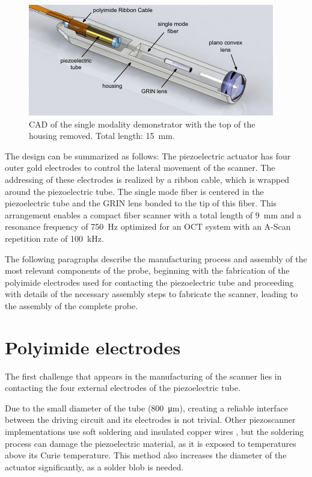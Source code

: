 \documentclass[10pt]{iopart}
\begin{document}
\begin{figure}[h!]\centering 
\includegraphics[width=\columnwidth]{figures/overview.pdf}
      \caption{CAD of the single modality demonstrator with the top of the housing removed. Total length: \SI{15}{\milli\meter}.}
      \label{fig:overview}
\end{figure}

The design can be summarized as follows: The piezoelectric actuator has four outer gold electrodes to control the lateral movement of the scanner. The addressing of these electrodes is realized by a ribbon cable, which is wrapped around the piezoelectric tube. The single mode fiber is centered in the piezoelectric tube and the GRIN lens bonded to the tip of this fiber. This arrangement enables a compact fiber scanner with a total length of \SI{9}{\milli\meter} and a resonance frequency of \SI{750}{\hertz} optimized for an OCT system with an A-Scan repetition rate of \SI{100}{\kilo\hertz}.

The following paragraphs describe the manufacturing process and assembly of the most relevant components of the probe, beginning with the fabrication of the polyimide electrodes used for contacting the piezoelectric tube and proceeding with details of the necessary assembly steps to fabricate the scanner, leading to the assembly of the complete probe.

\section{Polyimide electrodes}
The first challenge that appears in the manufacturing of the scanner lies in contacting the four external electrodes of the piezoelectric tube. 

Due to the small diameter of the tube (\SI{800}{\micro\meter}), creating a reliable interface between the driving circuit and its electrodes is not trivial. Other piezoscanner implementations use soft soldering and insulated copper wires \cite{Lee2010, Meinert, Huo2010}, but the soldering process can damage the piezoelectric material, as it is exposed to temperatures above its Curie temperature. This method also increases the diameter of the actuator significantly, as a solder blob is needed. %
\end{document}
